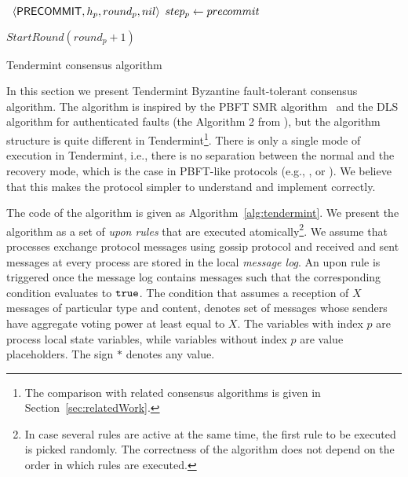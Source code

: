 \begin{algorithm}[htb!]
\begin{algorithmic}[1]
\SHORTSPACE
{} \label{line:tab:onTimeoutPrevote}
\STATE \Broadcast \ $\langle\mathsf{PRECOMMIT},h_p,round_p,nil\rangle$   \label{line:tab:precommit-nil-onTimeout}
\STATE $step_p \leftarrow precommit$
\ENDIF	
\ENDFUNCTION

\SHORTSPACE
{} \label{line:tab:onTimeoutPrecommit}
\STATE $StartRound(round_p + 1)$ \label{line:tab:nextRound} 
\ENDIF	
\ENDFUNCTION	
\end{algorithmic}
\caption{Tendermint consensus algorithm}
\label{alg:tendermint}
\end{algorithm}

In this section we present Tendermint Byzantine fault-tolerant consensus algorithm. The algorithm is inspired by the PBFT SMR algorithm~\cite{CL02:tcs} and the DLS algorithm for authenticated faults (the Algorithm 2 from \cite{DLS88:jacm}), but the algorithm structure is quite different in Tendermint\footnote{The comparison with related consensus algorithms is given in Section~\ref{sec:relatedWork}.}. There is only a single mode of execution in Tendermint, i.e., there is no separation between the normal and the recovery mode, which is the case in PBFT-like protocols (e.g., \cite{CL02:tcs}, \cite{Ver09:spinning} or \cite{Cle09:aardvark}). We believe that this makes the protocol simpler to understand and implement correctly.
   
The code of the algorithm is given as Algorithm~\ref{alg:tendermint}. We present the algorithm as a set of \emph{upon rules} that are executed atomically\footnote{In case several rules are active at the same time, the first rule to be executed is picked randomly. The correctness of the algorithm does not depend on the order in which rules are executed.}. We assume that processes exchange protocol messages using gossip protocol and received and sent messages at every process are stored in the local \emph{message log}. An upon rule is triggered once the message log contains messages such that the corresponding condition evaluates to $\tt{true}$. The condition that assumes a reception of $X$ messages of particular type and content, denotes set of messages whose senders have aggregate voting power at least equal to $X$. The variables with index $p$ are process local state variables, while variables without index $p$ are value placeholders. The sign $*$ denotes any value.    

